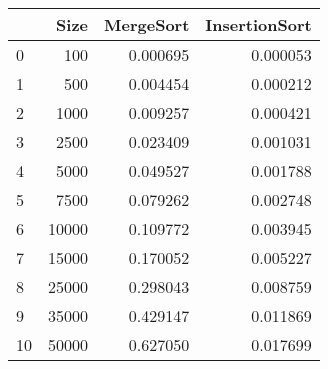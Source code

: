 \begin{tabular}{lrrr}
\toprule
{} &   Size &  MergeSort &  InsertionSort \\
\midrule
0  &    100 &   0.000695 &       0.000053 \\
1  &    500 &   0.004454 &       0.000212 \\
2  &   1000 &   0.009257 &       0.000421 \\
3  &   2500 &   0.023409 &       0.001031 \\
4  &   5000 &   0.049527 &       0.001788 \\
5  &   7500 &   0.079262 &       0.002748 \\
6  &  10000 &   0.109772 &       0.003945 \\
7  &  15000 &   0.170052 &       0.005227 \\
8  &  25000 &   0.298043 &       0.008759 \\
9  &  35000 &   0.429147 &       0.011869 \\
10 &  50000 &   0.627050 &       0.017699 \\
\bottomrule
\end{tabular}
